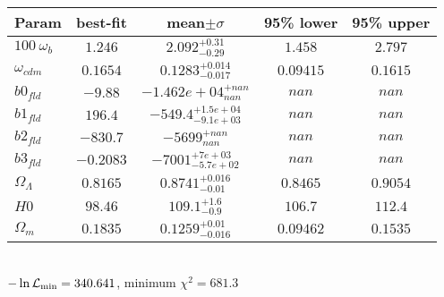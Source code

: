 \begin{tabular}{|l|c|c|c|c|} 
 \hline 
Param & best-fit & mean$\pm\sigma$ & 95\% lower & 95\% upper \\ \hline 
$100~\omega_{b }$ &$1.246$ & $2.092_{-0.29}^{+0.31}$ & $1.458$ & $2.797$ \\ 
$\omega_{cdm }$ &$0.1654$ & $0.1283_{-0.017}^{+0.014}$ & $0.09415$ & $0.1615$ \\ 
$b0_{fld }$ &$-9.88$ & $-1.462e+04_{nan}^{+nan}$ & $nan$ & $nan$ \\ 
$b1_{fld }$ &$196.4$ & $-549.4_{-9.1e+03}^{+1.5e+04}$ & $nan$ & $nan$ \\ 
$b2_{fld }$ &$-830.7$ & $-5699_{nan}^{+nan}$ & $nan$ & $nan$ \\ 
$b3_{fld }$ &$-0.2083$ & $-7001_{-5.7e+02}^{+7e+03}$ & $nan$ & $nan$ \\ 
$\Omega_{\Lambda }$ &$0.8165$ & $0.8741_{-0.01}^{+0.016}$ & $0.8465$ & $0.9054$ \\ 
$H0$ &$98.46$ & $109.1_{-0.9}^{+1.6}$ & $106.7$ & $112.4$ \\ 
$\Omega_{m }$ &$0.1835$ & $0.1259_{-0.016}^{+0.01}$ & $0.09462$ & $0.1535$ \\ 
\hline 
 \end{tabular} \\ 
$-\ln{\cal L}_\mathrm{min} =340.641$, minimum $\chi^2=681.3$ \\ 
